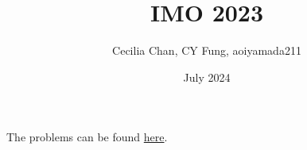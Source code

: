 \documentclass{article}
\title{IMO 2023}
\author{Cecilia Chan, CY Fung, aoiyamada211}
\date{July 2024}
\begin{document}
\maketitle

The problems can be found \href{https://www.imo-official.org/problems.aspx}{here}.


 
\end{document}
